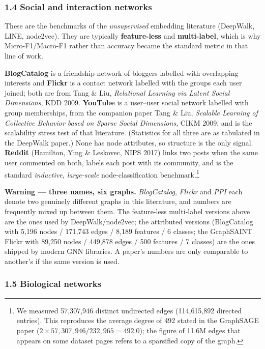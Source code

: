 \subsubsection*{1.4 Social and interaction networks}

These are the benchmarks of the \emph{unsupervised} embedding literature (DeepWalk, LINE,
node2vec). They are typically \textbf{feature-less} and \textbf{multi-label}, which is why
Micro-F1/Macro-F1 rather than accuracy became the standard metric in that line of work.

\textbf{BlogCatalog} is a friendship network of bloggers labelled with overlapping
interests and \textbf{Flickr} is a contact network labelled with the groups each user
joined; both are from Tang \& Liu, \emph{Relational Learning via Latent Social Dimensions},
KDD 2009. \textbf{YouTube} is a user--user social network labelled with group memberships,
from the companion paper Tang \& Liu, \emph{Scalable Learning of Collective Behavior based
on Sparse Social Dimensions}, CIKM 2009, and is the scalability stress test of that
literature. (Statistics for all three are as tabulated in the DeepWalk paper.) None has node
attributes, so structure is the only signal. \textbf{Reddit} (Hamilton, Ying \&
Leskovec, NIPS 2017) links two posts when the same user commented on both, labels each post
with its community, and is the standard \emph{inductive, large-scale} node-classification
benchmark.\footnote{We measured 57{,}307{,}946 distinct undirected edges
(114{,}615{,}892 directed entries). This reproduces the average degree of 492 stated in the
GraphSAGE paper ($2\times57{,}307{,}946/232{,}965 = 492.0$); the figure of 11.6M edges that
appears on some dataset pages refers to a sparsified copy of the graph.}

\noindent
\textbf{Warning --- three names, six graphs.} \emph{BlogCatalog}, \emph{Flickr} and
\emph{PPI} each denote two genuinely different graphs in this literature, and numbers are
frequently mixed up between them. The feature-less multi-label versions above are the ones
used by DeepWalk/node2vec; the attributed versions (BlogCatalog with 5{,}196 nodes /
171{,}743 edges / 8{,}189 features / 6 classes; the GraphSAINT Flickr with 89{,}250 nodes /
449{,}878 edges / 500 features / 7 classes) are the ones shipped by modern GNN libraries.
A paper's numbers are only comparable to another's if the same version is used.

\subsubsection*{1.5 Biological networks}


